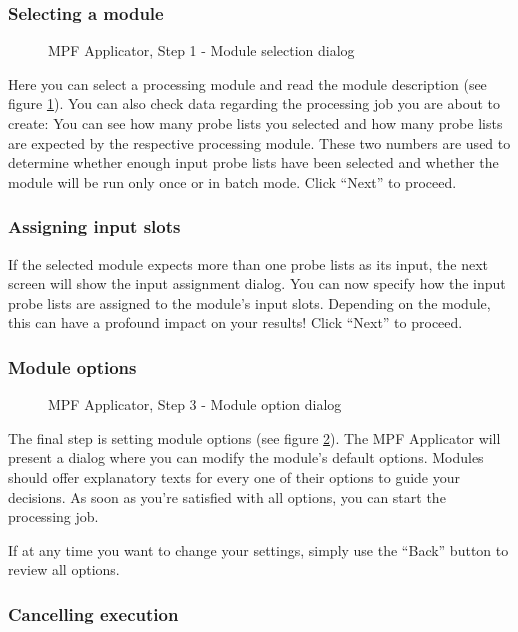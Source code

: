 \documentclass[11pt,fleqn,a4paper]{article}
\newcommand{\Figure}[4][optional,]{
  \begin{figure}[#1]
    \begin{center}
      \resizebox*{!}{#4\height}{\texttt{[image: \#2]}}
      \caption{#3 \label{#2}}
    \end{center}
  \end{figure}
}
\begin{document}
\subsubsection*{Selecting a module}

\Figure[!ht]{step1.eps}{ MPF Applicator, Step 1 - Module selection dialog}{0.5}

Here you can select a processing module and read the module description (see figure \ref{step1.eps}). You can also check data regarding the processing job you are about to create: You can see how many probe lists you selected and how many probe lists are expected by the respective processing module. These two numbers are used to determine whether enough input probe lists have been selected and whether the module will be run only once or in batch mode. Click ``Next'' to proceed.

\subsubsection*{Assigning input slots}

If the selected module expects more than one probe lists as its input, the next screen will show the input assignment dialog. You can now specify how the input probe lists are assigned to the module's input slots. Depending on the module, this can have a profound impact on your results! Click ``Next'' to proceed.

\subsubsection*{Module options}

\Figure[!ht]{step3.eps}{ MPF Applicator, Step 3 - Module option dialog}{0.5}


The final step is setting module options (see figure \ref{step3.eps}). The MPF Applicator will present a dialog where you can modify the module's default options. Modules should offer explanatory texts for every one of their options to guide your decisions. As soon as you're satisfied with all options, you can start the processing job.

\bigskip
If at any time you want to change your settings, simply use the ``Back'' button to review all options.

\subsubsection*{Cancelling execution}
\end{document}
